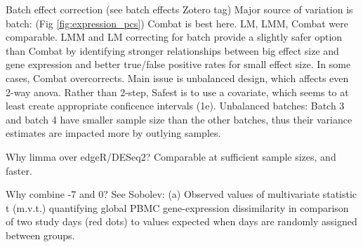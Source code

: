Batch effect correction (see batch effects Zotero tag)
Major source of variation is batch: (Fig \ref{fig:expression_pcs})
Combat is best here.
LM, LMM, Combat were comparable.
LMM and LM correcting for batch provide a slightly safer option than Combat by identifying stronger relationships between big effect size and gene expression and better true/false positive rates for small effect size.
In some cases, Combat overcorrects.
Main issue is unbalanced design, which affects even 2-way anova. Rather than 2-step, Safest is to use a covariate, which seems to at least create appropriate conficence intervals (1e).
Unbalanced batches:  Batch 3 and batch 4 have smaller sample size than the other batches, thus their variance estimates are impacted more by outlying samples.



Why limma over edgeR/DESeq2?
Comparable at sufficient sample sizes, and faster.

Why combine -7 and 0?
See Sobolev: (a) Observed values of multivariate statistic t (m.v.t.) quantifying global PBMC gene-expression dissimilarity in comparison of two study days (red dots) to values expected when days are randomly assigned between groups.


